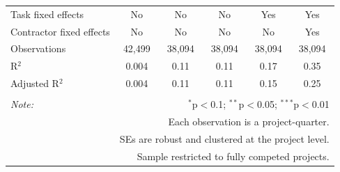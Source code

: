 \documentclass[
]{article}
\begin{document}
\begin{table}[H]
\begin{tabular}{@{\extracolsep{-2pt}}lccccc}
Task fixed effects & No & No & No & Yes & Yes \\ 
Contractor fixed effects & No & No & No & No & Yes \\ 
Observations & 42,499 & 38,094 & 38,094 & 38,094 & 38,094 \\ 
R$^{2}$ & 0.004 & 0.11 & 0.11 & 0.17 & 0.35 \\ 
Adjusted R$^{2}$ & 0.004 & 0.11 & 0.11 & 0.15 & 0.25 \\ 
\hline 
\hline \\[-1.8ex] 
\textit{Note:}  & \multicolumn{5}{r}{$^{*}$p$<$0.1; $^{**}$p$<$0.05; $^{***}$p$<$0.01} \\ 
 & \multicolumn{5}{r}{Each observation is a project-quarter.} \\ 
 & \multicolumn{5}{r}{SEs are robust and clustered at the project level.} \\ 
 & \multicolumn{5}{r}{Sample restricted to fully competed projects.} \\ 
\end{tabular} 
\end{table}
\end{document}
